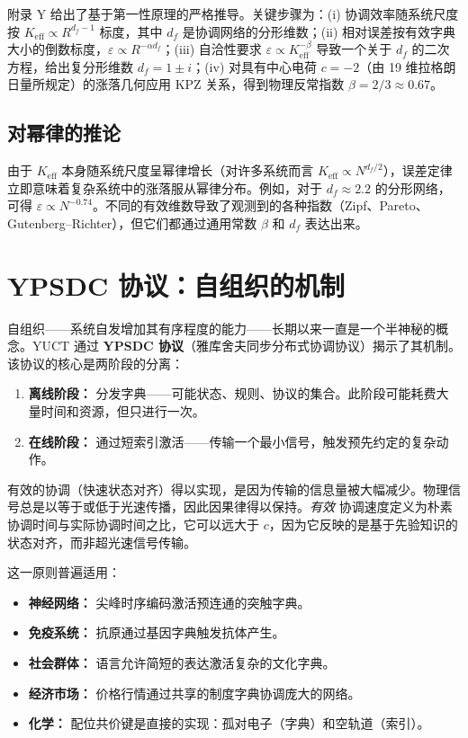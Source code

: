 \documentclass[11pt]{article}
\theoremstyle{remark}
\newcommand{\Keff}{K_{\mathrm{eff}}}
\begin{document}
	附录 Y 给出了基于第一性原理的严格推导。关键步骤为：(i) 协调效率随系统尺度按 \(\Keff \propto R^{d_f-1}\) 标度，其中 \(d_f\) 是协调网络的分形维数；(ii) 相对误差按有效字典大小的倒数标度，\(\varepsilon \propto R^{-\alpha d_f}\)；(iii) 自洽性要求 \(\varepsilon \propto \Keff^{-\beta}\) 导致一个关于 \(d_f\) 的二次方程，给出复分形维数 \(d_f = 1 \pm i\)；(iv) 对具有中心电荷 \(c=-2\)（由 19 维拉格朗日量所规定）的涨落几何应用 KPZ 关系，得到物理反常指数 \(\beta = 2/3 \approx 0.67\)。
	
	\subsection{对幂律的推论}
	
	由于 \(\Keff\) 本身随系统尺度呈幂律增长（对许多系统而言 \(\Keff \propto N^{d_f/2}\)），误差定律立即意味着复杂系统中的涨落服从幂律分布。例如，对于 \(d_f \approx 2.2\) 的分形网络，可得 \(\varepsilon \propto N^{-0.74}\)。不同的有效维数导致了观测到的各种指数（Zipf、Pareto、Gutenberg–Richter），但它们都通过通用常数 \(\beta\) 和 \(d_f\) 表达出来。
	
	\section{YPSDC 协议：自组织的机制}
	\label{sec:ypsdc}
	
	自组织——系统自发增加其有序程度的能力——长期以来一直是一个半神秘的概念。YUCT 通过 \textbf{YPSDC 协议}（雅库舍夫同步分布式协调协议）揭示了其机制。该协议的核心是两阶段的分离：
	\begin{enumerate}
		\item \textbf{离线阶段：} 分发字典——可能状态、规则、协议的集合。此阶段可能耗费大量时间和资源，但只进行一次。
		\item \textbf{在线阶段：} 通过短索引激活——传输一个最小信号，触发预先约定的复杂动作。
	\end{enumerate}
	
	有效的协调（快速状态对齐）得以实现，是因为传输的信息量被大幅减少。物理信号总是以等于或低于光速传播，因此因果律得以保持。\emph{有效} 协调速度定义为朴素协调时间与实际协调时间之比，它可以远大于 \(c\)，因为它反映的是基于先验知识的状态对齐，而非超光速信号传输。
	
	这一原则普遍适用：
	\begin{itemize}
		\item \textbf{神经网络：} 尖峰时序编码激活预连通的突触字典。
		\item \textbf{免疫系统：} 抗原通过基因字典触发抗体产生。
		\item \textbf{社会群体：} 语言允许简短的表达激活复杂的文化字典。
		\item \textbf{经济市场：} 价格行情通过共享的制度字典协调庞大的网络。
		\item \textbf{化学：} 配位共价键是直接的实现：孤对电子（字典）和空轨道（索引）。
	\end{itemize}
	
\end{document}
